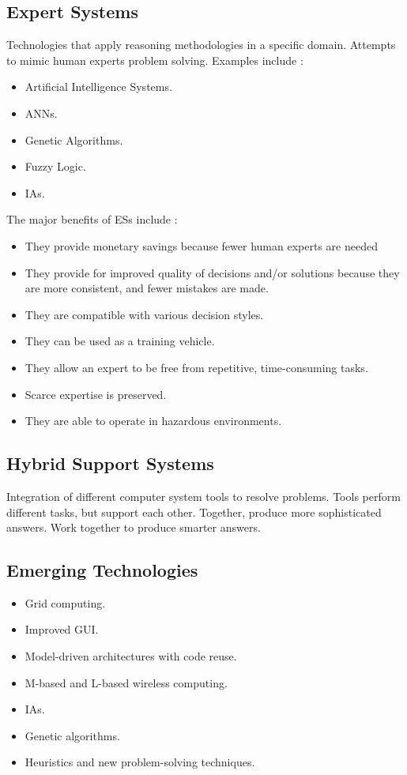 \documentclass[12pt,a4paper,final,twoside,onecolumn,titlepage]{book}
\begin{document}
\subsection{Expert Systems}
Technologies that apply reasoning methodologies in a specific domain. Attempts to mimic human experts problem solving. Examples include \cite{MNAS02}: 
\begin{itemize}
\item Artificial Intelligence Systems.
\item \gls{ANN}s.
\item Genetic Algorithms.
\item Fuzzy Logic.
\item \gls{IA}s.
\end{itemize}
The major benefits of \gls{ES}s include \cite{MNAS02}:
\begin{itemize}
\item They provide monetary savings because fewer human experts are needed
\item They provide for improved quality of decisions and/or solutions because they are more consistent, and fewer mistakes are made.
\item They are compatible with various decision styles.
\item They can be used as a training vehicle.
\item They allow an expert to be free from repetitive, time-consuming tasks.
\item Scarce expertise is preserved.
\item They are able to operate in hazardous environments.
\end{itemize}

\subsection{Hybrid Support Systems}
Integration of different computer system tools to resolve problems. Tools perform different tasks, but support each other. Together, produce more sophisticated answers. Work together to produce smarter answers.

\subsection{Emerging Technologies}
\begin{itemize}
\item Grid computing.
\item Improved GUI.
\item Model-driven architectures with code reuse.
\item M-based and L-based wireless computing.
\item \gls{IA}s.
\item Genetic algorithms.
\item Heuristics and new problem-solving techniques.
\end{itemize}
\end{document}
